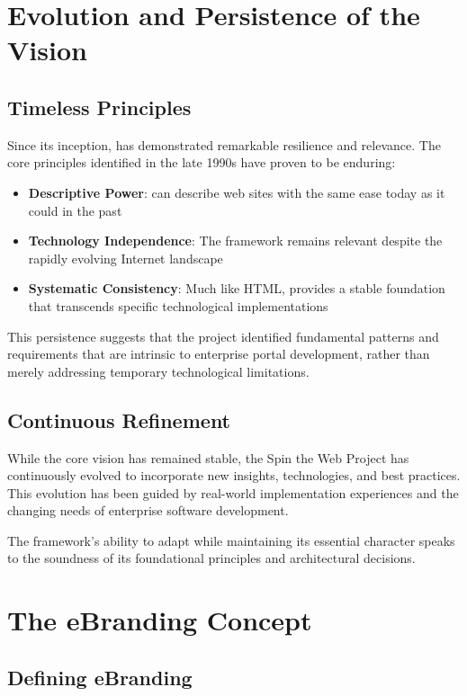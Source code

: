 \section{Evolution and Persistence of the Vision}

\subsection{Timeless Principles}

Since its inception, \wbdl{} has demonstrated remarkable resilience and relevance. The core principles identified in the late 1990s have proven to be enduring:

\begin{itemize}
\item \textbf{Descriptive Power}: \wbdl{} can describe web sites with the same ease today as it could in the past
\item \textbf{Technology Independence}: The framework remains relevant despite the rapidly evolving Internet landscape
\item \textbf{Systematic Consistency}: Much like HTML, \wbdl{} provides a stable foundation that transcends specific technological implementations
\end{itemize}

This persistence suggests that the project identified fundamental patterns and requirements that are intrinsic to enterprise portal development, rather than merely addressing temporary technological limitations.

\subsection{Continuous Refinement}

While the core vision has remained stable, the Spin the Web Project has continuously evolved to incorporate new insights, technologies, and best practices. This evolution has been guided by real-world implementation experiences and the changing needs of enterprise software development.

The framework's ability to adapt while maintaining its essential character speaks to the soundness of its foundational principles and architectural decisions.

\section{The eBranding Concept}

\subsection{Defining eBranding}

